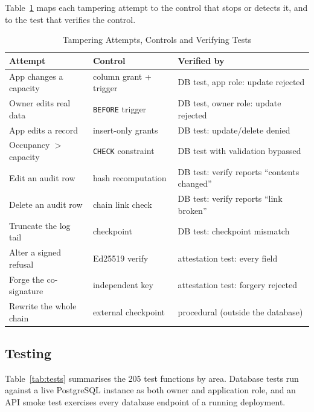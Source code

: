 Table~\ref{tab:threats} maps each tampering attempt to the control that stops or detects it, and to the test that verifies the control.

\begin{table}[!t]
\centering
\caption{Tampering Attempts, Controls and Verifying Tests}
\label{tab:threats}
\scriptsize
\setlength{\tabcolsep}{2.2pt}
\begin{tabular}{@{}p{2.3cm}p{2.1cm}p{3.15cm}@{}}
\toprule
Attempt & Control & Verified by \\
\midrule
App changes a capacity & column grant + trigger & DB test, app role: update rejected \\
Owner edits real data & \texttt{BEFORE} trigger & DB test, owner role: update rejected \\
App edits a record & insert-only grants & DB test: update/delete denied \\
Occupancy $>$ capacity & \texttt{CHECK} constraint & DB test with validation bypassed \\
Edit an audit row & hash recomputation & DB test: verify reports ``contents changed'' \\
Delete an audit row & chain link check & DB test: verify reports ``link broken'' \\
Truncate the log tail & checkpoint & DB test: checkpoint mismatch \\
Alter a signed refusal & Ed25519 verify & attestation test: every field \\
Forge the co-signature & independent key & attestation test: forgery rejected \\
Rewrite the whole chain & external checkpoint & procedural (outside the database) \\
\bottomrule
\end{tabular}
\end{table}

\subsection{Testing}
Table~\ref{tab:tests} summarises the 205 test functions by area. Database tests run against a live PostgreSQL instance as both owner and application role, and an API smoke test exercises every database endpoint of a running deployment.

